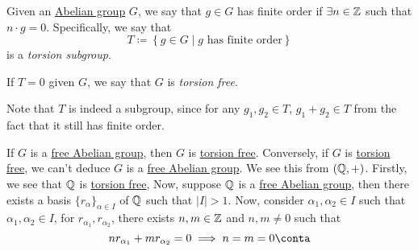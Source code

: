 \begin{definition}\label{def:torsion-subgroup}
	Given an \hyperref[def:Abelian-group]{Abelian group} \(G\), we say that \(g\in G\) has finite order if \(\exists n\in \mathbb{\MakeUppercase{z}} \) such that
	\(n\cdot g = 0\). Specifically, we say that
	\[
		T\coloneqq \left\{g\in G\mid g\text{ has finite order}\right\}
	\]
	is a \emph{torsion subgroup}.

	If \(T= 0\) given \(G\), we say that \(G\) is \emph{torsion free}. \label{def:torsion-free}
\end{definition}
\begin{note}
	Note that \(T\) is indeed a subgroup, since for any \(g_1, g_2\in T\), \(g_1 + g_2\in T\) from the fact that it still has finite order.
\end{note}

\begin{remark}
	If \(G\) is a \hyperref[def:free-Abelian-group]{free Abelian group}, then \(G\) is \hyperref[def:torsion-free]{torsion free}. Conversely, if \(G\) is
	\hyperref[def:torsion-free]{torsion free}, we can't deduce \(G\) is a \hyperref[def:free-Abelian-group]{free Abelian group}. We see this from
	\((\mathbb{\MakeUppercase{q}} , +)\). Firstly, we see that \(\mathbb{\MakeUppercase{q}} \) is \hyperref[def:torsion-free]{torsion free},
	Now, suppose \(\mathbb{\MakeUppercase{q}} \) is a \hyperref[def:free-Abelian-group]{free Abelian group}, then there exists a basis \(\{r_\alpha \}_{\alpha \in I}\)
	of \(\mathbb{\MakeUppercase{q}} \) such that \(\left\vert I \right\vert > 1\). Now, consider \(\alpha _1, \alpha _2\in I\) such that \(\alpha _1, \alpha _2\in I\), for
	\(r_{\alpha _1}, r_{\alpha _2}\), there exists \(n, m\in \mathbb{\MakeUppercase{z}} \) and \(n, m\neq 0\) such that
	\[
		n r_{\alpha _1} + m r_{\alpha _2} = 0 \implies n = m = 0\conta
	\]
\end{remark}

